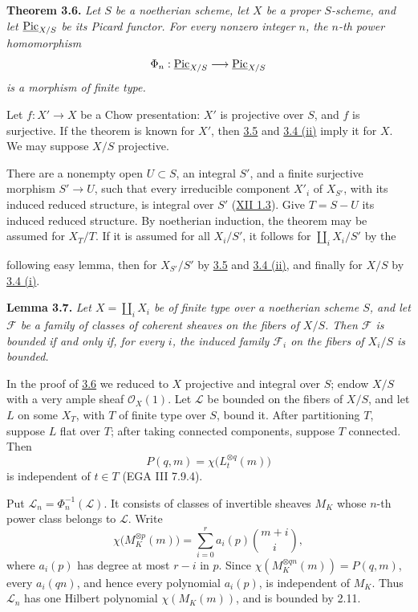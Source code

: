 \textbf{Theorem 3.6.} \emph{Let \(S\) be a noetherian scheme, let \(X\)
be a proper \(S\)-scheme, and let \(\underline{\operatorname{Pic}}_{X/S}\) be its
Picard functor. For every nonzero integer \(n\), the \(n\)-th power
homomorphism}
\[
\Phi_n:\underline{\operatorname{Pic}}_{X/S}\longrightarrow\underline{\operatorname{Pic}}_{X/S}
\]
\emph{is a morphism of finite type.}

Let \(f:X'\to X\) be a Chow presentation: \(X'\) is projective over \(S\),
and \(f\) is surjective. If the theorem is known for \(X'\), then \hyperlink{sga6.e13.thm.3-5}{3.5} and
\hyperlink{sga6.e13.lem.3-4}{3.4 (ii)} imply it for \(X\). We may suppose \(X/S\) projective.

There are a nonempty open \(U\subset S\), an integral \(S'\), and a
finite surjective morphism \(S'\to U\), such that every irreducible
component \(X'_i\) of \(X_{S'}\), with its induced reduced structure, is
integral over \(S'\) (\hyperlink{sga6.e12.lem.1-3}{XII 1.3}). Give \(T=S-U\) its induced reduced
structure. By noetherian induction, the theorem may be assumed for
\(X_T/T\). If it is assumed for all \(X_i/S'\), it follows for
\(\coprod_iX_i/S'\) by the

following easy lemma, then for \(X_{S'}/S'\) by \hyperlink{sga6.e13.thm.3-5}{3.5} and \hyperlink{sga6.e13.lem.3-4}{3.4 (ii)}, and
finally for \(X/S\) by \hyperlink{sga6.e13.lem.3-4}{3.4 (i)}.

\textbf{Lemma 3.7.} \emph{Let \(X=\coprod_iX_i\) be of finite type over a
noetherian scheme \(S\), and let \(\mathcal F\) be a family of classes of
coherent sheaves on the fibers of \(X/S\). Then \(\mathcal F\) is bounded
if and only if, for every \(i\), the induced family \(\mathcal F_i\) on
the fibers of \(X_i/S\) is bounded.}

In the proof of \hyperlink{sga6.e13.thm.3-6}{3.6} we reduced to \(X\) projective and integral over \(S\);
endow \(X/S\) with a very ample sheaf \(\mathcal O_X(1)\). Let
\(\mathscr L\) be bounded on the fibers of \(X/S\), and let \(L\) on some
\(X_T\), with \(T\) of finite type over \(S\), bound it. After
partitioning \(T\), suppose \(L\) flat over \(T\); after taking connected
components, suppose \(T\) connected. Then
\[
P(q,m)=\chi\bigl(L_t^{\otimes q}(m)\bigr)
\]
is independent of \(t\in T\) (EGA III 7.9.4).

Put \(\mathscr L_n=\Phi_n^{-1}(\mathscr L)\). It consists of classes of
invertible sheaves \(M_K\) whose \(n\)-th power class belongs to
\(\mathscr L\). Write
\[
\chi\bigl(M_K^{\otimes p}(m)\bigr)
=\sum_{i=0}^{r}a_i(p)\binom{m+i}{i},
\]
where \(a_i(p)\) has degree at most \(r-i\) in \(p\). Since
\(\chi(M_K^{\otimes qn}(m))=P(q,m)\), every \(a_i(qn)\), and hence every
polynomial \(a_i(p)\), is independent of \(M_K\). Thus \(\mathscr L_n\)
has one Hilbert polynomial \(\chi(M_K(m))\), and is bounded by 2.11.

